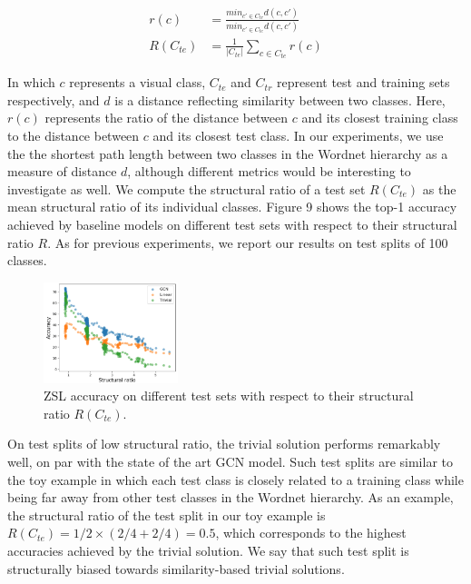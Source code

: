 \begin{subequations} 
\begin{align}
r(c) &= \frac{min_{c' \in C_{tr}}d(c, c')}{min_{c' \in C_{te}}d(c, c')} \\
R(C_{te}) &=  \frac{1}{|C_{te}|} \sum_{c \in C_{te}} r(c)
\end{align}
\end{subequations} 


In which $c$ represents a visual class, $C_{te}$ and $C_{tr}$ represent test and training sets respectively, 
and $d$ is a distance reflecting similarity between two classes.
Here, $r(c)$ represents the ratio of the distance between $c$ and its closest training class to the distance between $c$ and its closest test class.
In our experiments, we use the the shortest path length between two classes in the Wordnet hierarchy as a measure of distance $d$,
although different metrics would be interesting to investigate as well.
We compute the structural ratio of a test set $R(C_{te})$ as the mean structural ratio of its individual classes.
Figure 9 shows the top-1 accuracy achieved by baseline models on different test sets with respect to their structural ratio $R$.
As for previous experiments, we report our results on test splits of 100 classes.

\begin{figure}[h!]
\centering
\includegraphics[width=0.35\textwidth]{Figure_10.png}
\caption{
ZSL accuracy on different test sets with respect to their structural ratio $R(C_{te})$.
}
\end{figure}

On test splits of low structural ratio, the trivial solution performs remarkably well, on par with the state of the art GCN model.
Such test splits are similar to the toy example in which each test class is closely related to a training class while being far away from other test classes in the Wordnet hierarchy.
As an example, the structural ratio of the test split in our toy example is $R(C_{te})=1/2 \times (2/4 + 2/4) = 0.5$, which corresponds to the highest accuracies achieved by the trivial solution.
We say that such test split is structurally biased towards similarity-based trivial solutions.

